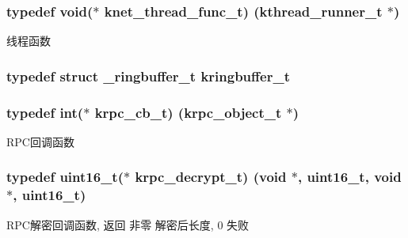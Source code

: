 \subsubsection[{knet\+\_\+thread\+\_\+func\+\_\+t}]{\setlength{\rightskip}{0pt plus 5cm}typedef void($\ast$ knet\+\_\+thread\+\_\+func\+\_\+t) ({\bf kthread\+\_\+runner\+\_\+t} $\ast$)}\label{a00051_a8741dac4a9f8d97603eb3a30a3473b13_a8741dac4a9f8d97603eb3a30a3473b13}
线程函数 \hypertarget{a00051_a66d91f7667db1f0b2983fc25e1a20f1c_a66d91f7667db1f0b2983fc25e1a20f1c}{}
\subsubsection[{kringbuffer\+\_\+t}]{\setlength{\rightskip}{0pt plus 5cm}typedef struct {\bf \+\_\+ringbuffer\+\_\+t} {\bf kringbuffer\+\_\+t}}\label{a00051_a66d91f7667db1f0b2983fc25e1a20f1c_a66d91f7667db1f0b2983fc25e1a20f1c}
\hypertarget{a00051_a06bb708c1b97445d3a5d0c1b32ad2ab6_a06bb708c1b97445d3a5d0c1b32ad2ab6}{}
\subsubsection[{krpc\+\_\+cb\+\_\+t}]{\setlength{\rightskip}{0pt plus 5cm}typedef int($\ast$ krpc\+\_\+cb\+\_\+t) ({\bf krpc\+\_\+object\+\_\+t} $\ast$)}\label{a00051_a06bb708c1b97445d3a5d0c1b32ad2ab6_a06bb708c1b97445d3a5d0c1b32ad2ab6}
R\+P\+C回调函数 \hypertarget{a00051_a5cf750f151c90f0589f68fe8c4421f1d_a5cf750f151c90f0589f68fe8c4421f1d}{}
\subsubsection[{krpc\+\_\+decrypt\+\_\+t}]{\setlength{\rightskip}{0pt plus 5cm}typedef uint16\+\_\+t($\ast$ krpc\+\_\+decrypt\+\_\+t) (void $\ast$, uint16\+\_\+t, void $\ast$, uint16\+\_\+t)}\label{a00051_a5cf750f151c90f0589f68fe8c4421f1d_a5cf750f151c90f0589f68fe8c4421f1d}
R\+P\+C解密回调函数, 返回 非零 解密后长度, 0 失败 \hypertarget{a00051_ae41a67cc07f8dff897ca978e03b1f2d7_ae41a67cc07f8dff897ca978e03b1f2d7}{}
